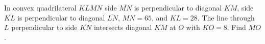 In convex quadrilateral $KLMN$ side $\overline{MN}$ is perpendicular to diagonal $\overline{KM}$, side $\overline{KL}$ is perpendicular to diagonal $\overline{LN}$, $MN = 65$, and $KL = 28$. The line through $L$ perpendicular to side $\overline{KN}$ intersects diagonal $\overline{KM}$ at $O$ with $KO = 8$. Find $MO$.
